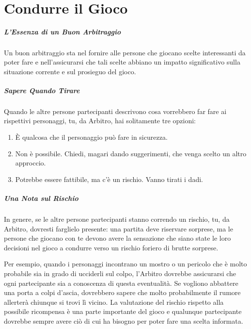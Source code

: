 \documentclass[itdr]{subfiles}
\begin{document}
~\vspace{14ex}

\chapter{Condurre il Gioco}
\label{ch:condurre_il_gioco}

\paragraph{L’Essenza di un Buon Arbitraggio}
Un buon arbitraggio sta nel fornire alle persone che giocano scelte interessanti da poter fare e nell’assicurarsi che tali scelte abbiano un impatto significativo sulla situazione corrente e sul prosieguo del gioco.

\vfill

\paragraph{Sapere Quando Tirare}
Quando le altre persone partecipanti descrivono cosa vorrebbero far fare ai rispettivi personaggi, tu, da Arbitro, hai solitamente tre opzioni:
\begin{enumerate}
	\item È qualcosa che il personaggio può fare in sicurezza.
	\item Non è possibile. Chiedi, \mbox{magari} dando suggerimenti, che venga scelto un altro approccio. 
	\item Potrebbe essere fattibile, ma c’è un rischio. Vanno tirati i dadi.
\end{enumerate}

\vfill

\paragraph{Una Nota sul Rischio}
In genere, se le altre persone partecipanti stanno correndo un rischio, tu, da Arbitro, dovresti farglielo presente: una partita deve riservare sorprese, ma le persone che giocano con te devono avere la sensazione che siano state le loro decisioni nel gioco a condurre verso un rischio foriero di brutte sorprese.

Per esempio, quando i personaggi incontrano un mostro o un pericolo che è molto probabile sia in grado di ucciderli sul colpo, l’Arbitro dovrebbe assicurarsi che ogni partecipante sia a conoscenza di questa eventualità. Se vogliono abbattere una porta a colpi d’ascia, dovrebbero sapere che molto probabilmente il rumore allerterà chiunque si trovi lì vicino. La valutazione del rischio rispetto alla possibile ricompensa è una parte importante del gioco e qualunque partecipante dovrebbe sempre avere ciò di cui ha bisogno per poter fare una scelta informata.
\end{document}
